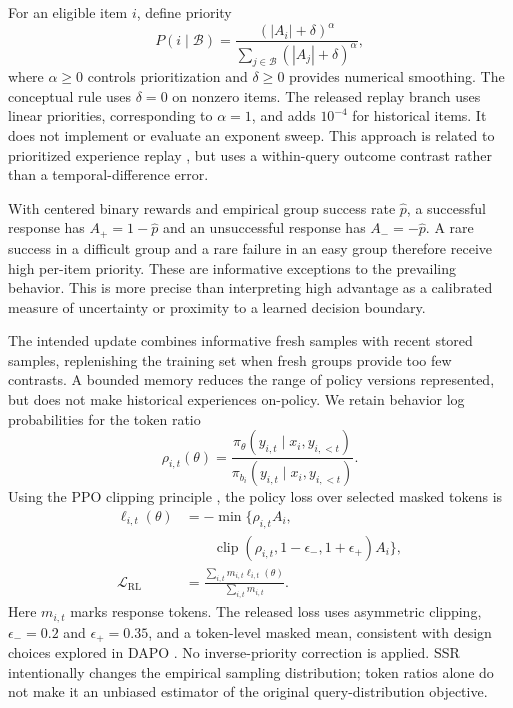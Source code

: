 \documentclass[10pt,twocolumn]{article}
\newcommand{\clip}{\operatorname{clip}}
\begin{document}
For an eligible item $i$, define priority
\begin{equation}
 P(i\mid\mathcal B)=\frac{(|A_i|+\delta)^\alpha}
 {\sum_{j\in\mathcal B}(|A_j|+\delta)^\alpha},
 \label{eq:priority}
\end{equation}
where $\alpha\geq0$ controls prioritization and $\delta\geq0$ provides numerical smoothing. The conceptual rule uses $\delta=0$ on nonzero items. The released replay branch uses linear priorities, corresponding to $\alpha=1$, and adds $10^{-4}$ for historical items. It does not implement or evaluate an exponent sweep. This approach is related to prioritized experience replay \citep{per}, but uses a within-query outcome contrast rather than a temporal-difference error.

With centered binary rewards and empirical group success rate $\hat p$, a successful response has $A_+=1-\hat p$ and an unsuccessful response has $A_-=-\hat p$. A rare success in a difficult group and a rare failure in an easy group therefore receive high per-item priority. These are informative exceptions to the prevailing behavior. This is more precise than interpreting high advantage as a calibrated measure of uncertainty or proximity to a learned decision boundary.

The intended update combines informative fresh samples with recent stored samples, replenishing the training set when fresh groups provide too few contrasts. A bounded memory reduces the range of policy versions represented, but does not make historical experiences on-policy. We retain behavior log probabilities for the token ratio
\begin{equation}
 \rho_{i,t}(\theta)=\frac{\pi_\theta(y_{i,t}\mid x_i,y_{i,<t})}
 {\pi_{b_i}(y_{i,t}\mid x_i,y_{i,<t})}.
 \label{eq:ratio}
\end{equation}
Using the PPO clipping principle \citep{ppo}, the policy loss over selected masked tokens is
\begin{align}
 \ell_{i,t}(\theta)&=-\min\bigl\{\rho_{i,t}A_i,\nonumber\\
 &\qquad\clip(\rho_{i,t},1-\epsilon_-,1+\epsilon_+)A_i\bigr\},\nonumber\\
 \mathcal L_{\mathrm{RL}}&=
 \frac{\sum_{i,t}m_{i,t}\ell_{i,t}(\theta)}{\sum_{i,t}m_{i,t}}.
 \label{eq:policy}
\end{align}
Here $m_{i,t}$ marks response tokens. The released loss uses asymmetric clipping, $\epsilon_-=0.2$ and $\epsilon_+=0.35$, and a token-level masked mean, consistent with design choices explored in DAPO \citep{dapo}. No inverse-priority correction is applied. SSR intentionally changes the empirical sampling distribution; token ratios alone do not make it an unbiased estimator of the original query-distribution objective.
\end{document}
